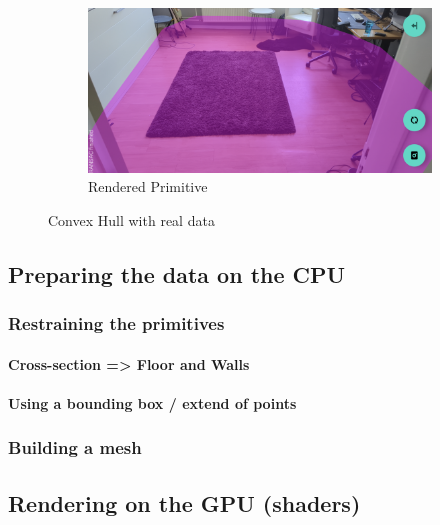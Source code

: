 \begin{figure}[ht!]
    \vspace{0.5em}

    \begin{subfigure}[b]{0.8\textwidth}
        \centering
        \includegraphics[width=\linewidth]{images/hull}
        \caption{Rendered Primitive}
    \end{subfigure}%
    \caption{Convex Hull with real data}
    \label{fig:convex-hull}
\end{figure}





\parencite{graham_efficient_1972}
\parencite{andrew_another_1979}

\subsection{Preparing the data on the CPU}

\subsubsection{Restraining the primitives}

\paragraph{Cross-section => Floor and Walls}

\paragraph{Using a bounding box / extend of points}

\subsubsection{Building a mesh}

\subsection{Rendering on the GPU (shaders)}
